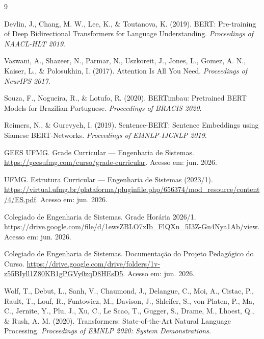 \documentclass[12pt,a4paper]{article}
\begin{document}
\begin{thebibliography}{9}

Devlin, J., Chang, M. W., Lee, K., \& Toutanova, K. (2019).
BERT: Pre-training of Deep Bidirectional Transformers for Language Understanding.
\textit{Proceedings of NAACL-HLT 2019}.

Vaswani, A., Shazeer, N., Parmar, N., Uszkoreit, J., Jones, L., Gomez, A. N., Kaiser, L., \& Polosukhin, I. (2017).
Attention Is All You Need.
\textit{Proceedings of NeurIPS 2017}.

Souza, F., Nogueira, R., \& Lotufo, R. (2020).
BERTimbau: Pretrained BERT Models for Brazilian Portuguese.
\textit{Proceedings of BRACIS 2020}.

Reimers, N., \& Gurevych, I. (2019).
Sentence-BERT: Sentence Embeddings using Siamese BERT-Networks.
\textit{Proceedings of EMNLP-IJCNLP 2019}.

GEES UFMG. Grade Curricular — Engenharia de Sistemas.
\url{https://geesufmg.com/curso/grade-curricular}. Acesso em: jun. 2026.

UFMG. Estrutura Curricular — Engenharia de Sistemas (2023/1).
\url{https://virtual.ufmg.br/plataforma/pluginfile.php/656374/mod_resource/content/4/ES.pdf}. Acesso em: jun. 2026.

Colegiado de Engenharia de Sistemas. Grade Horária 2026/1.
\url{https://drive.google.com/file/d/1ewsZBLO7xIb_FlQXn_5I3Z-Gn4Nya1Ab/view}. Acesso em: jun. 2026.

Colegiado de Engenharia de Sistemas. Documentação do Projeto Pedagógico do Curso.
\url{https://drive.google.com/drive/folders/1v-z55BIyll1Z80KB1gPGVy0zqD8HEsD5}. Acesso em: jun. 2026.

Wolf, T., Debut, L., Sanh, V., Chaumond, J., Delangue, C., Moi, A., Cistac, P., Rault, T., Louf, R., Funtowicz, M., Davison, J., Shleifer, S., von Platen, P., Ma, C., Jernite, Y., Plu, J., Xu, C., Le Scao, T., Gugger, S., Drame, M., Lhoest, Q., \& Rush, A. M. (2020).
Transformers: State-of-the-Art Natural Language Processing.
\textit{Proceedings of EMNLP 2020: System Demonstrations}.

\end{thebibliography}
\end{document}
